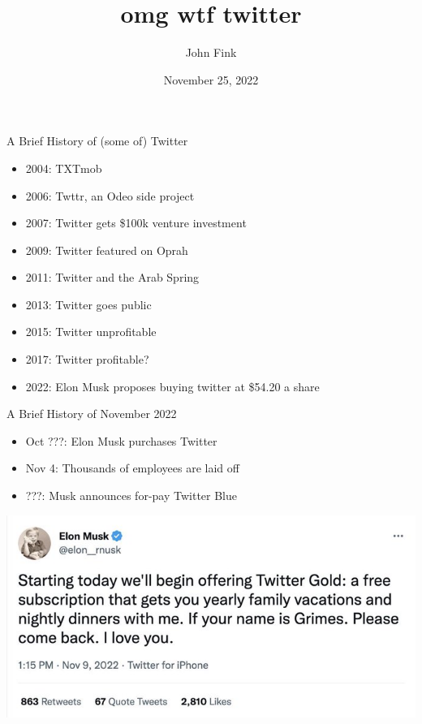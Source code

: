 \documentclass{beamer}
\title{omg wtf twitter}
\author{John Fink}
\date{November 25, 2022}
\begin{document}
\begin{frame}[plain]
    \maketitle
\end{frame}
\begin{frame}{A Brief History of (some of) Twitter}
	\begin{itemize}
		\pause
		\item 2004: TXTmob
		\pause
		\item 2006: Twttr, an Odeo side project
		\pause
		\item 2007: Twitter gets \$100k venture investment
		\pause
		\item 2009: Twitter featured on Oprah
		\pause
		\item 2011: Twitter and the Arab Spring
		\pause
		\item 2013: Twitter goes public
		\pause 
		\item 2015: Twitter unprofitable
		\pause
		\item 2017: Twitter profitable?
		\pause
		\item 2022: Elon Musk proposes buying twitter at \$54.20 a share
	\end{itemize}
\end{frame}

\begin{frame}{A Brief History of November 2022}
	\begin{itemize}
		\pause
		\item Oct ???: Elon Musk purchases Twitter
		\pause
		\item Nov 4: Thousands of employees are laid off
		\pause
		\item ???: Musk announces for-pay Twitter Blue
	\end{itemize}
\end{frame}
\begin{frame}
	\includegraphics[width = \textwidth]{twitter-gold}
\end{frame}
\end{document}
